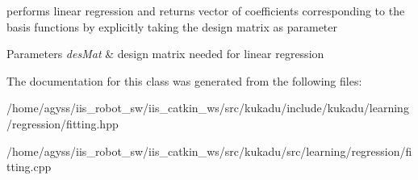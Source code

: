 performs linear regression and returns vector of coefficients corresponding to the basis functions by explicitly taking the design matrix as parameter 


\begin{DoxyParams}{Parameters}
{\em des\+Mat} & design matrix needed for linear regression \\
\hline
\end{DoxyParams}


The documentation for this class was generated from the following files\+:\begin{DoxyCompactItemize}
\item 
/home/agyss/iis\+\_\+robot\+\_\+sw/iis\+\_\+catkin\+\_\+ws/src/kukadu/include/kukadu/learning/regression/fitting.\+hpp\item 
/home/agyss/iis\+\_\+robot\+\_\+sw/iis\+\_\+catkin\+\_\+ws/src/kukadu/src/learning/regression/fitting.\+cpp\end{DoxyCompactItemize}
